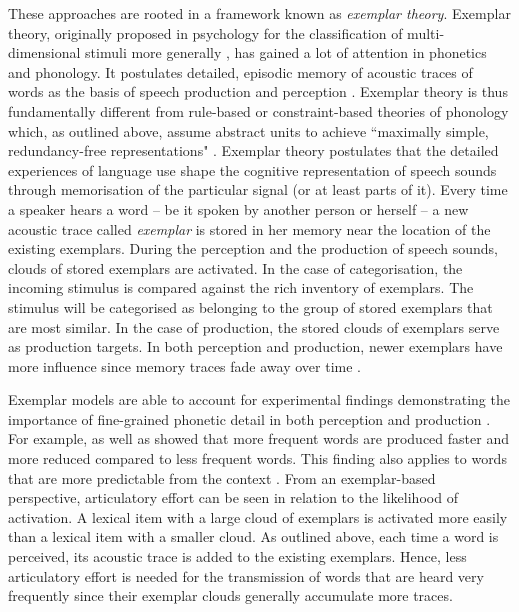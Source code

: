 These approaches are rooted in a framework known as \emph{exemplar theory}. Exemplar theory, originally proposed in psychology for the classification of multi-dimensional stimuli more generally \citep{Nosofsky1986, Hintzman1986}, has gained a lot of attention in phonetics and phonology. It postulates detailed, episodic memory of acoustic traces of words as the basis of speech production and perception \citep[among others]{Goldinger1996, Johnson1997, Pierrehumbert2001, Bybee2001, Pierrehumbert2016}. Exemplar theory is thus fundamentally different from rule-based or constraint-based theories of phonology which, as outlined above, assume abstract units to achieve ``maximally simple, redundancy-free representations" \citep[213]{GahlYu2006}. Exemplar theory postulates that the detailed experiences of language use shape the cognitive representation of speech sounds through memorisation of the particular signal (or at least parts of it). Every time a speaker hears a word -- be it spoken by another person or herself -- a new acoustic trace called \emph{exemplar} is stored in her memory near the location of the existing exemplars. During the perception and the production of speech sounds, clouds of stored exemplars are activated. In the case of categorisation, the incoming stimulus is compared against the rich inventory of exemplars. The stimulus will be categorised as belonging to the group of stored exemplars that are most similar. In the case of production, the stored clouds of exemplars serve as production targets. In both perception and production, newer exemplars have more influence since memory traces fade away over time \citep{Schweitzer2012}.

Exemplar models are able to account for experimental findings demonstrating the importance of fine-grained phonetic detail in both perception and production \citep{Pierrehumbert2016}. For example, \cite{Wright1979} as well as \cite{Jurafskyetal2002} showed that more frequent words are produced faster and more reduced compared to less frequent words. This finding also applies to words that are more predictable from the context \citep{Seyfarth2014, AylettTurk2004, Halletal2018}. From an exemplar-based perspective, articulatory effort can be seen in relation to the likelihood of activation. A lexical item with a large cloud of exemplars is activated more easily than a lexical item with a smaller cloud. As outlined above, each time a word is perceived, its acoustic trace is added to the existing exemplars. Hence, less articulatory effort is needed for the transmission of words that are heard very frequently since their exemplar clouds generally accumulate more traces. 


